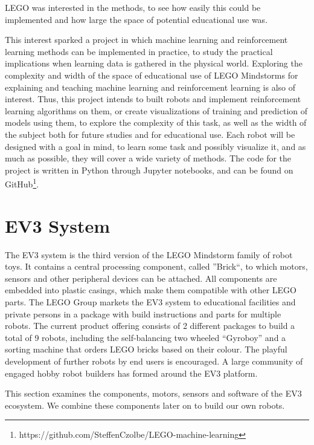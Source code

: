 \documentclass[11pt, a4paper]{article}
\begin{document}
LEGO was interested in the methods, to see how easily this could be implemented and how large the space of potential educational use was.

This interest sparked a project in which machine learning and reinforcement learning methods can be implemented in practice, to study the practical implications when learning data is gathered in the physical world. Exploring the complexity and width of the space of educational use of LEGO Mindstorms for explaining and teaching machine learning and reinforcement learning is also of interest. Thus, this project intends to built robots and implement reinforcement learning algorithms on them, or create visualizations of training and prediction of models using them, to explore the complexity of this task, as well as the width of the subject both for future studies and for educational use. Each robot will be designed with a goal in mind, to learn some task and possibly visualize it, and as much as possible, they will cover a wide variety of methods. The code for the project is written in Python through Jupyter notebooks, and can be found on GitHub\footnote{https://github.com/SteffenCzolbe/LEGO-machine-learning}.

\section{EV3 System}
The EV3 system is the third version of the LEGO Mindstorm family of robot toys. It contains a central processing component, called ''Brick``, to which motors, sensors and other peripheral devices can be attached. All components are embedded into plastic casings, which make them compatible with other LEGO parts. The LEGO Group markets the EV3 system to educational facilities and private persons in a package with build instructions and parts for multiple robots. The current product offering consists of 2 different packages to build a total of 9 robots, including the self-balancing two wheeled ``Gyroboy'' and a sorting machine that orders LEGO bricks based on their colour. The playful development of further robots by end users is encouraged. A large community of engaged hobby robot builders has formed around the EV3 platform.

This section examines the components, motors, sensors and software of the EV3 ecosystem. We combine these components later on to build our own robots.
\end{document}
